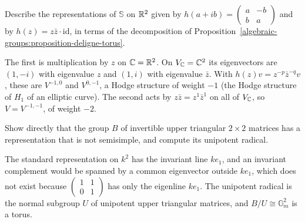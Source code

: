 \begin{exercise}\label{algebraic-groups:exercise-deligne-torus-examples}
Describe the representations of $\mathbb{S}$ on $\mathbb{R}^2$ given by $h(a + ib) = \left(\begin{smallmatrix}a & -b \\ b & a\end{smallmatrix}\right)$ and by $h(z) = z\bar z \cdot \mathrm{id}$, in terms of
the decomposition of Proposition~\ref{algebraic-groups:proposition-deligne-torus}.
\end{exercise}

\begin{solution}
The first is multiplication by $z$ on $\mathbb{C} = \mathbb{R}^2$. On $V_{\mathbb{C}} = \mathbb{C}^2$ its eigenvectors are $(1, -i)$ with eigenvalue $z$ and $(1, i)$ with eigenvalue $\bar z$. With
$h(z)v = z^{-p}\bar z^{-q}v$, these are $V^{-1,0}$ and $V^{0,-1}$, a Hodge structure of weight $-1$ (the Hodge structure of $H_1$ of an elliptic curve). The second acts by
$z\bar z = z^1\bar z^1$ on all of $V_{\mathbb{C}}$, so $V = V^{-1,-1}$, of weight $-2$.
\end{solution}

\begin{exercise}\label{algebraic-groups:exercise-unipotent-not-reductive}
Show directly that the group $B$ of invertible upper triangular $2 \times 2$ matrices has a representation that is not semisimple, and compute its unipotent radical.
\end{exercise}

\begin{solution}
The standard representation on $k^2$ has the invariant line $ke_1$, and an invariant complement would be spanned by a common eigenvector outside $ke_1$, which does not exist
because $\left(\begin{smallmatrix}1 & 1 \\ 0 & 1\end{smallmatrix}\right)$ has only the eigenline $ke_1$. The unipotent radical is the normal subgroup $U$ of unipotent upper triangular
matrices, and $B/U \cong \mathbb{G}_m^2$ is a torus.
\end{solution}
